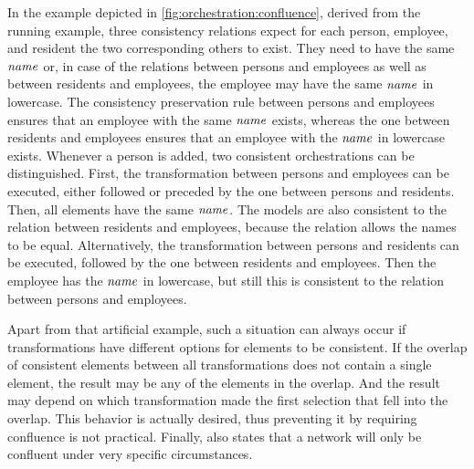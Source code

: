 In the example depicted in \autoref{fig:orchestration:confluence}, derived from the running example, three consistency relations expect for each person, employee, and resident the two corresponding others to exist.
They need to have the same $\mathit{name}$ or, in case of the relations between persons and employees as well as between residents and employees, the employee may have the same $\mathit{name}$ in lowercase.
The consistency preservation rule between persons and employees ensures that an employee with the same $\mathit{name}$ exists, whereas the one between residents and employees ensures that an employee with the $\mathit{name}$ in lowercase exists.
Whenever a person is added, two consistent orchestrations can be distinguished.
First, the transformation between persons and employees can be executed, either followed or preceded by the one between persons and residents. Then, all elements have the same $\mathit{name}$.
The models are also consistent to the relation between residents and employees, because the relation allows the names to be equal.
Alternatively, the transformation between persons and residents can be executed, followed by the one between residents and employees.
Then the employee has the $\mathit{name}$ in lowercase, but still this is consistent to the relation between persons and employees.

Apart from that artificial example, such a situation can always occur if transformations have different options for elements to be consistent.
If the overlap of consistent elements between all transformations does not contain a single element, the result may be any of the elements in the overlap.
And the result may depend on which transformation made the first selection that fell into the overlap.
This behavior is actually desired, thus preventing it by requiring confluence is not practical.
Finally, \textcite[p.~14]{stevens2020BidirectionalTransformationLarge-SoSym} also states that a network will only be confluent under very specific circumstances.



